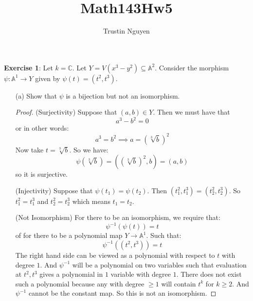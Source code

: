 \documentclass{article}
\title{Math143Hw5}
\author{Trustin Nguyen}
\begin{document}
    \maketitle

\reversemarginpar

\textbf{Exercise 1}: Let $k = \mathbb{C}$. Let $Y = V(x^{3} - y^{2}) \subseteq \mathbb{A}^{2}$. Consider the morphism $\psi : \mathbb{A}^{1} \rightarrow Y$ given by $\psi(t) = (t^{2}, t^{3})$.
    \begin{itemize}
        \item [(a)] Show that $\psi$ is a bijection but not an isomorphism.
            \begin{proof}
                (Surjectivity) Suppose that $(a, b) \in Y$. Then we must have that 
                    \begin{equation*}
                        a^{3} - b^{2} = 0
                    \end{equation*}
                or in other words:
                    \begin{equation*}
                        a^{3} = b^{2} \implies a = (\sqrt[3]{b})^{2}
                    \end{equation*}
                Now take $t = \sqrt[3]{b}$. So we have:
                    \begin{equation*}
                        \psi(\sqrt[3]{b}) = ((\sqrt[3]{b})^{2}, b) = (a, b)
                    \end{equation*}
                so it is surjective. 

                (Injectivity) Suppose that $\psi(t_{1}) = \psi(t_{2})$. Then $(t_{1}^{2}, t_{1}^{3}) = (t_{2}^{2}, t_{2}^{3})$. So $t_{1}^{2} = t_{1}^{3}$ and $t_{2}^{2} = t_{2}^{3}$ which means $t_{1} = t_{2}$.

                (Not Isomorphism) For there to be an isomorphism, we require that:
                    \begin{equation*}
                        \psi^{-1}(\psi(t)) = t
                    \end{equation*}
                of for there to be a polynomial map $Y \rightarrow \mathbb{A}^{1}$. Such that:
                    \begin{equation*}
                        \psi^{-1}((t^{2}, t^{3})) = t
                    \end{equation*}
                The right hand side can be viewed as a polynomial with respect to $t$ with degree $1$. And $\psi^{-1}$ will be a polynomial on two variables such that evaluation at $t^{2}, t^{3}$ gives a polynomial in $1$ variable with degree $1$. There does not exist such a polynomial because any with degree $\geq 1$ will contain $t^{k}$ for $k \geq 2$. And $\psi^{-1}$ cannot be the constant map. So this is not an isomorphism.
            \end{proof}


\end{itemize}
\end{document}
